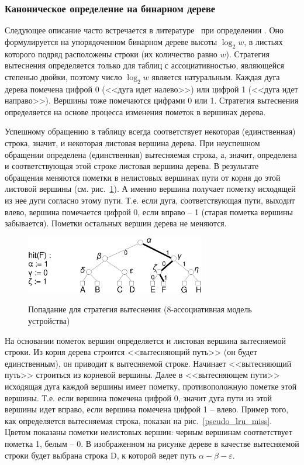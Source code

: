 \subsubsection{Каноническое определение \PseudoLRU на бинарном дереве}

Следующее описание часто встречается в литературе~\cite{FundamentalOfComputerOrganizationAndDesign} при
определении \PseudoLRU. Оно формулируется на упорядоченном бинарном дереве высоты $\log_2 w$, в листьях которого подряд расположены строки (их количество равно $w$). Стратегия вытеснения
\PseudoLRU определяется только для таблиц с ассоциативностью, являющейся степенью двойки, поэтому число $\log_2 w$ является натуральным. Каждая дуга дерева помечена цифрой 0 (<<дуга идет налево>>) или цифрой 1 (<<дуга идет направо>>). Вершины тоже помечаются цифрами 0 или 1. Стратегия вытеснения определяется на основе процесса изменения пометок в вершинах дерева.

Успешному обращению в таблицу всегда соответствует некоторая (единственная) строка, значит, и некоторая листовая вершина дерева. При неуспешном обращении определена (единственная) вытесняемая строка, а, значит, определена и соответствующая этой строке листовая вершина дерева. В результате обращения меняются пометки в нелистовых вершинах пути от корня до этой листовой вершины (см. рис.~\ref{pseudo_lru_hit}). А именно вершина получает пометку
исходящей из нее дуги согласно этому пути. Т.е. если дуга, соответствующая пути, выходит влево, вершина помечается цифрой 0, если вправо -- 1 (старая пометка вершины забывается). Пометки остальных вершин дерева не меняются.

\begin{figure}[h] \center
  \includegraphics[width=0.7\textwidth]{2.theor/plruhit}\\
  \caption{Попадание для стратегия вытеснения \PseudoLRU
  (8-ассоциативная модель устройства)}\label{pseudo_lru_hit}
\end{figure}

На основании пометок вершин определяется и листовая вершина вытесняемой строки.
Из корня дерева строится <<вытесняющий путь>> (он будет единственным), он приводит к вытесняемой строке. Начинает <<вытесняющий путь>> строиться из корневой вершины. Далее в <<вытесняющем пути>> исходящая дуга каждой вершины имеет пометку, противоположную пометке этой вершины. Т.е. если вершина помечена цифрой 0, значит дуга пути из этой вершины идет вправо, если вершина помечена цифрой 1 -- влево. Пример того, как определяется вытесняемая строка, показан на рис.~\ref{pseudo_lru_miss}. Цветом показаны пометки нелистовых вершин: черным
вершинам соответствует пометка 1, белым -- 0. В изображенном на рисунке дереве в качестве вытесняемой строки будет выбрана строка D, к которой ведет путь $\alpha-\beta-\varepsilon$.

